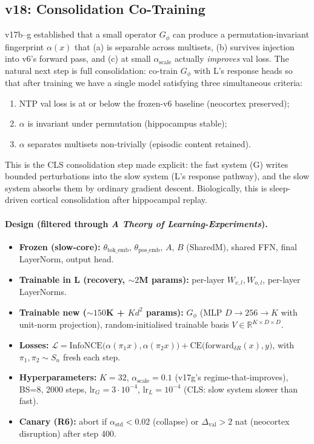 \documentclass[11pt, a4paper]{article}
\theoremstyle{plain}
\theoremstyle{definition}
\theoremstyle{remark}
\begin{document}
\subsection{v18: Consolidation Co-Training}
\label{sec:v18-consolidation}

v17b--g established that a small operator $G_\phi$ can produce a permutation-invariant fingerprint $\alpha(x)$ that (a) is separable across multisets, (b) survives injection into v6's forward pass, and (c) at small $\alpha_{\mathrm{scale}}$ actually \emph{improves} val loss.
The natural next step is full consolidation: co-train $G_\phi$ with L's response heads so that after training we have a single model satisfying three simultaneous criteria:
\begin{enumerate}[nosep,leftmargin=2em]
\item NTP val loss is at or below the frozen-v6 baseline (neocortex preserved);
\item $\alpha$ is invariant under permutation (hippocampus stable);
\item $\alpha$ separates multisets non-trivially (episodic content retained).
\end{enumerate}
This is the CLS consolidation step made explicit: the fast system (G) writes bounded perturbations into the slow system (L's response pathway), and the slow system absorbs them by ordinary gradient descent.
Biologically, this is sleep-driven cortical consolidation after hippocampal replay.

\paragraph{Design (filtered through \emph{A Theory of Learning-Experiments}).}
\begin{itemize}[nosep]
\item \textbf{Frozen (slow-core):} $\theta_{\mathrm{tok\_emb}}$, $\theta_{\mathrm{pos\_emb}}$, $A$, $B$ (SharedM), shared FFN, final LayerNorm, output head.
\item \textbf{Trainable in L (recovery, $\sim 2$M params):} per-layer $W_{v,l}, W_{o,l}$, per-layer LayerNorms.
\item \textbf{Trainable new ($\sim 150$K + $K d^2$ params):} $G_\phi$ (MLP $D \to 256 \to K$ with unit-norm projection), random-initialised trainable basis $V \in \mathbb{R}^{K \times D \times D}$.
\item \textbf{Losses:} $\mathcal{L} = \mathrm{InfoNCE}\big(\alpha(\pi_1 x), \alpha(\pi_2 x)\big) + \mathrm{CE}\big(\mathrm{forward}_{\delta R}(x), y\big)$, with $\pi_1, \pi_2 \sim S_n$ fresh each step.
\item \textbf{Hyperparameters:} $K=32$, $\alpha_{\mathrm{scale}}=0.1$ (v17g's regime-that-improves), BS=8, 2000 steps, $\mathrm{lr}_G = 3 \cdot 10^{-4}$, $\mathrm{lr}_L = 10^{-4}$ (CLS: slow system slower than fast).
\item \textbf{Canary (R6):} abort if $\alpha_{\mathrm{std}} < 0.02$ (collapse) or $\Delta_{\mathrm{val}} > 2$ nat (neocortex disruption) after step 400.
\end{itemize}
\end{document}
